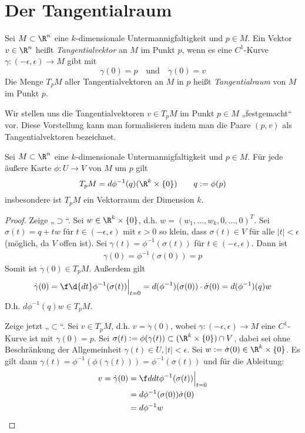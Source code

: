 \documentclass{mycourse}
\begin{document}
\section{Der Tangentialraum}

\begin{df*}		
	Sei $M\subset \R^n$ eine $k$-dimensionale Untermannigfaltigkeit und $p\in M$.
	Ein Vektor $v\in \R^n$ heißt \emph{Tangentialvektor} an $M$ im Punkt $p$, wenn es eine $C^1$-Kurve $\gamma: (-\epsilon, \epsilon) \to M$ gibt mit
	\[
		\gamma(0) = p \quad \text{und} \quad \dot\gamma(0) = v
	\]
	Die Menge $T_pM$ aller Tangentialvektoren an $M$ in $p$ heißt \emph{Tangentialraum} von $M$ im Punkt $p$.
\end{df*}

\begin{note}
	Wir stellen uns die Tangentialvektoren $v\in T_pM$ im Punkt $p\in M$ „festgemacht“ vor.
	Diese Vorstellung kann man formalisieren indem man die Paare $(p,v)$ als Tangentialvektoren bezeichnet.
\end{note}

\begin{st}
	\label{14.10}
	Sei $M\subset\R^n$ eine $k$-dimensionale Untermannigfaltigkeit und $p\in M$.
	Für jede äußere Karte $\phi: U\to V$ von $M$ um $p$ gilt
	\[
		T_pM = d\phi^{-1}(q)(\R^k\times\{0\}) \qquad q := \phi(p)
	\]
	insbesondere ist $T_pM$ ein Vektorraum der Dimension $k$.
	\begin{proof}
		Zeige „$\supset$“.
		Sei $w\in \R^k\times\{0\}$, d.h. $w=(w_1,\dotsc, w_k, 0,\dotsc, 0)^T$.
		Sei $\sigma(t) = q+tw$ für $t\in (-\epsilon, \epsilon)$ mit $\epsilon > 0$ so klein, dass $\sigma(t) \in V$ für alle $|t| < \epsilon$ (möglich, da $V$ offen ist).
		Sei $\gamma(t) = \phi^{-1}(\sigma(t))$ für $t\in (-\epsilon,\epsilon)$.
		Dann ist
		\begin{align*}
			\gamma(0) = \phi^{-1}(\sigma(0)) = p
		\end{align*}
		Somit ist $\dot\gamma(0) \in T_pM$.
		Außerdem gilt
		\begin{align*}
			\dot\gamma(0) = \f\d{dt}\phi^{-1}(\sigma(t))\Big|_{t=0} = d(\phi^{-1})(\sigma(0))\cdot \dot \sigma(0) = d(\phi^{-1})(q)w
		\end{align*}
		D.h. $d\phi^{-1}(q)w\in T_pM$.

		Zeige jetzt „$\subset$“.
		Sei $v\in T_pM$, d.h. $v=\dot \gamma (0)$, wobei $\gamma : (-\epsilon,\epsilon)\to M$ eine $C^1$-Kurve ist mit $\gamma(0) = p$.
		Sei $\sigma(t) := \phi(\gamma(t)) \subset (\R^k\times\{0\})\cap V$, dabei sei ohne Beschränkung der Allgemeinheit $\gamma(t)\in U, |t|<\epsilon$.
		Sei $w:= \dot \sigma(0) \in \R^k\times\{0\}$.
		Es gilt dann $\gamma(t) = \phi^{-1}(\phi(\gamma(t))) = \phi^{-1}(\sigma(t))$ und für die Ableitung:
		\begin{align*}
			v = \dot\gamma(0) &= \f d{dt}\phi^{-1}(\sigma(t))\Big|_{t=0}\\
																		   &= d\phi^{-1}(\sigma(0))\dot\sigma(0)\\
															   &= d\phi^{-1}w
		\end{align*}
	\end{proof}
\end{st}
\end{document}
